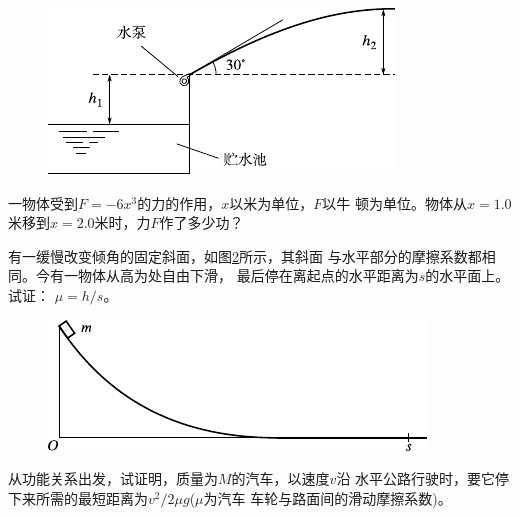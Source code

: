 \begin{exercises}
\begin{figure}[h]
  \centering
  \includegraphics{figure/fig06.16}
  \caption{}
  \label{fig:06.16}
  \vspace{-0.8em}
\end{figure}

\exercise 一物体受到$ F = - 6 x ^ { 3 } $的力的作用，$ x $以米为单位，$ F $以牛
顿为单位。物体从$ x = 1.0 $米移到$ x = 2.0 $米时，力$ F $作了多少功？

\clearpage
\exercise 有一缓慢改变倾角的固定斜面，如图\ref{fig:06.17}\;所示，其斜面
与水平部分的摩擦系数都相同。今有一物体从高为处自由下滑，
最后停在离起点的水平距离为$ s $的水平面上。试证： $ \mu = h / s $。
\begin{figure}[h]
  \centering
  \includegraphics{figure/fig06.17}
  \caption{}
  \label{fig:06.17}
  \vspace{-0.8em}
\end{figure}

\exercise 从功能关系出发，试证明，质量为$ M $的汽车，以速度$ v $沿
水平公路行驶时，要它停下来所需的最短距离为$ v ^ { 2 } / 2 \mu g $($ \mu $为汽车
车轮与路面间的滑动摩擦系数)。


\end{exercises}
